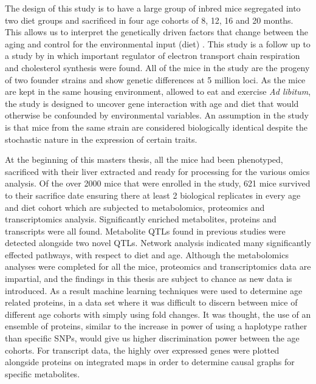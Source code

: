 \documentclass[a4paper]{book}
\begin{document}
	The design of this study is to have a large group of inbred mice segregated into two diet groups and sacrificed in four age cohorts of 8, 12, 16 and 20 months. This allows us to interpret the genetically driven factors that change between the aging and control for the environmental input (diet) . This study is a follow up to a study by \citeauthor{Williams2016SystemsFunction} in which important regulator of electron transport chain respiration and cholesterol synthesis were found. All of the mice in the study are the progeny of two founder strains and show genetic differences at 5 million loci. As the mice are kept in the same housing environment, allowed to eat and exercise \textit{Ad libitum}, the study is designed to uncover gene interaction with age and diet that would otherwise be confounded by environmental variables. An assumption in the study is that mice from the same strain are considered biologically identical despite the stochastic nature in the expression of certain traits\citep{Czyz2012Geneticdifferences}.

At the beginning of this masters thesis, all the mice had been phenotyped, sacrificed with their liver extracted and ready for processing for the various omics analysis. Of the over 2000 mice that were enrolled in the study, 621 mice survived to their sacrifice date ensuring there at least 2 biological replicates in every age and diet cohort which are subjected to metabolomics, proteomics and transcriptomics analysis. Significantly enriched metabolites, proteins and transcripts were all found. Metabolite QTLs found in previous studies were detected alongside two novel QTLs. Network analysis indicated many significantly effected pathways, with respect to diet and age. Although the metabolomics analyses were completed for all the mice, proteomics and transcriptomics data are impartial, and the findings in this thesis are subject to chance as new data is introduced. As a result machine learning techniques were used to determine age related proteins, in a data set where it was difficult to discern between mice of different age cohorts with simply using fold changes. It was thought, the use of an ensemble of proteins, similar to the increase in power of using a haplotype rather than specific SNPs, would give us higher discrimination power between the age cohorts\citep{Lorenz2010Performancebarley}. For transcript data, the highly over expressed genes were plotted alongside proteins on integrated maps in order to determine causal graphs for specific metabolites.
	
\end{document}
